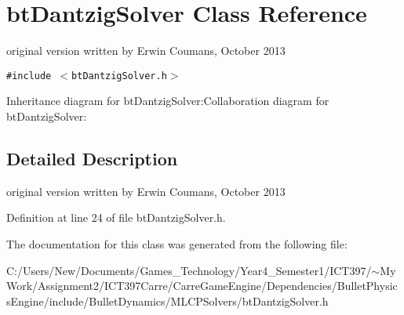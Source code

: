\hypertarget{classbt_dantzig_solver}{
\section{btDantzigSolver Class Reference}
\label{classbt_dantzig_solver}
}
original version written by Erwin Coumans, October 2013  


{\tt \#include $<$btDantzigSolver.h$>$}

Inheritance diagram for btDantzigSolver:Collaboration diagram for btDantzigSolver:

\subsection{Detailed Description}
original version written by Erwin Coumans, October 2013 

Definition at line 24 of file btDantzigSolver.h.

The documentation for this class was generated from the following file:\begin{CompactItemize}
\item 
C:/Users/New/Documents/Games\_\-Technology/Year4\_\-Semester1/ICT397/$\sim$My Work/Assignment2/ICT397Carre/CarreGameEngine/Dependencies/BulletPhysicsEngine/include/BulletDynamics/MLCPSolvers/btDantzigSolver.h\end{CompactItemize}

